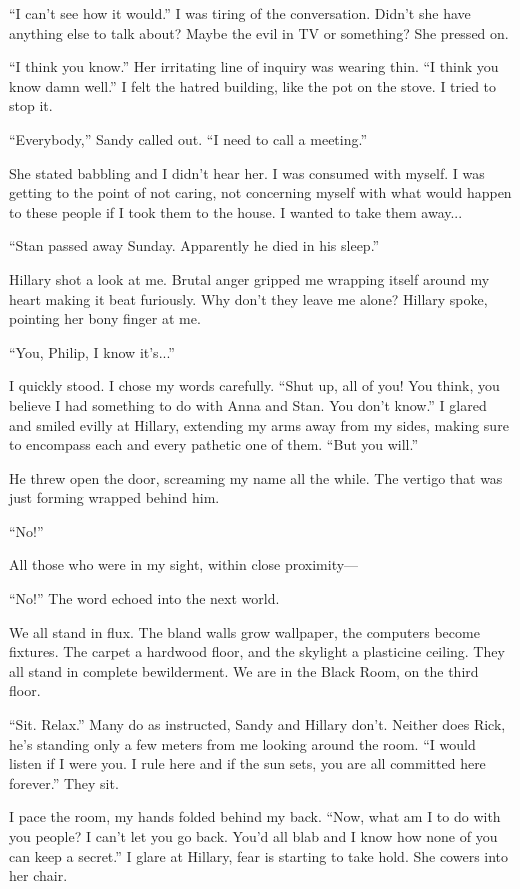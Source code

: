 ``I can't see how it would.'' I was tiring of the conversation. Didn't
she have anything else to talk about? Maybe the evil in TV or something?
She pressed on.

``I think you know.'' Her irritating line of inquiry was wearing thin.
``I think you know damn well.'' I felt the hatred building, like the pot
on the stove. I tried to stop it.

``Everybody,'' Sandy called out. ``I need to call a meeting.''

She stated babbling and I didn't hear her. I was consumed with myself. I
was getting to the point of not caring, not concerning myself with what
would happen to these people if I took them to the house. I wanted to
take them away...

``Stan passed away Sunday. Apparently he died in his sleep.''

Hillary shot a look at me. Brutal anger gripped me wrapping itself
around my heart making it beat furiously. Why don't they leave me alone?
Hillary spoke, pointing her bony finger at me.

``You, Philip, I know it's...''

I quickly stood. I chose my words carefully. ``Shut up, all of you! You
think, you believe I had something to do with Anna and Stan. You don't
know.'' I glared and smiled evilly at Hillary, extending my arms away
from my sides, making sure to encompass each and every pathetic one of
them. ``But you will.''

He threw open the door, screaming my name all the while. The vertigo
that was just forming wrapped behind him.

``No!''

All those who were in my sight, within close proximity---

``No!'' The word echoed into the next world.

We all stand in flux. The bland walls grow wallpaper, the computers
become fixtures. The carpet a hardwood floor, and the skylight a
plasticine ceiling. They all stand in complete bewilderment. We are in
the Black Room, on the third floor.

``Sit. Relax.'' Many do as instructed, Sandy and Hillary don't. Neither
does Rick, he's standing only a few meters from me looking around the
room. ``I would listen if I were you. I rule here and if the sun sets,
you are all committed here forever.'' They sit.

I pace the room, my hands folded behind my back. ``Now, what am I to do
with you people? I can't let you go back. You'd all blab and I know how
none of you can keep a secret.'' I glare at Hillary, fear is starting to
take hold. She cowers into her chair.

